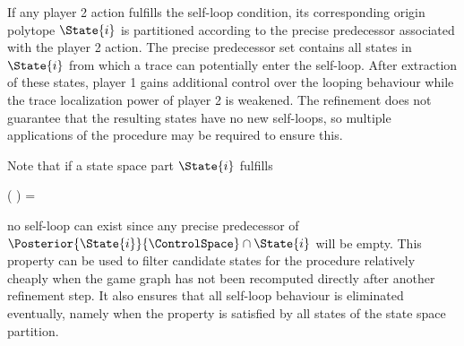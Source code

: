     If any player 2 action fulfills the self-loop condition, its corresponding origin polytope $\State{i}$ is partitioned according to the precise predecessor associated with the player 2 action.
    The precise predecessor set contains all states in $\State{i}$ from which a trace can potentially enter the self-loop.
    After extraction of these states, player 1 gains additional control over the looping behaviour while the trace localization power of player 2 is weakened.
    The refinement does not guarantee that the resulting states have no new self-loops, so multiple applications of the procedure may be required to ensure this.

    Note that if a state space part $\State{i}$ fulfills

    \startformula
        ( \cap {}) \ominus \RandomSpace = \emptyset \EndComma
    \stopformula

    no self-loop can exist since any precise predecessor of $\Posterior{\State{i}}{\ControlSpace} \cap \State{i}$ will be empty.
    This property can be used to filter candidate states for the procedure relatively cheaply when the game graph has not been recomputed directly after another refinement step.
    It also ensures that all self-loop behaviour is eliminated eventually, namely when the property is satisfied by all states of the state space partition.

\stopsubsection

